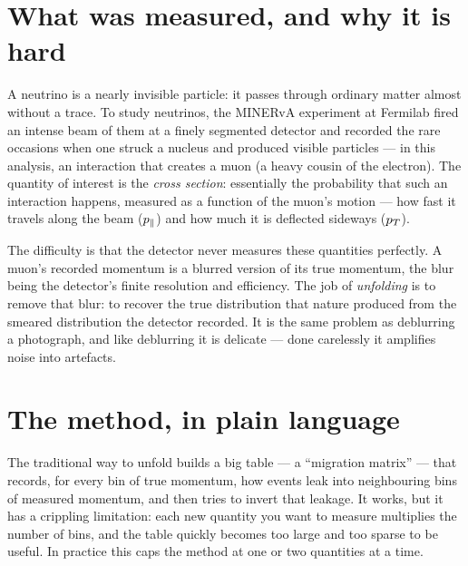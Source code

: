 
\section{What was measured, and why it is hard}

A neutrino is a nearly invisible particle: it passes through ordinary matter
almost without a trace. To study neutrinos, the MINERvA experiment at Fermilab
fired an intense beam of them at a finely segmented detector and recorded the
rare occasions when one struck a nucleus and produced visible particles --- in
this analysis, an interaction that creates a muon (a heavy cousin of the
electron). The quantity of interest is the \emph{cross section}: essentially the
probability that such an interaction happens, measured as a function of the
muon's motion --- how fast it travels along the beam ($p_{\parallel}$) and how much it is
deflected sideways ($p_{T}$).

The difficulty is that the detector never measures these quantities perfectly.
A muon's recorded momentum is a blurred version of its true momentum, the blur
being the detector's finite resolution and efficiency. The job of
\emph{unfolding} is to remove that blur: to recover the true distribution that
nature produced from the smeared distribution the detector recorded. It is the
same problem as deblurring a photograph, and like deblurring it is delicate ---
done carelessly it amplifies noise into artefacts.

\section{The method, in plain language}

The traditional way to unfold builds a big table --- a ``migration matrix'' ---
that records, for every bin of true momentum, how events leak into neighbouring
bins of measured momentum, and then tries to invert that leakage. It works, but
it has a crippling limitation: each new quantity you want to measure multiplies
the number of bins, and the table quickly becomes too large and too sparse to be
useful. In practice this caps the method at one or two quantities at a time.

